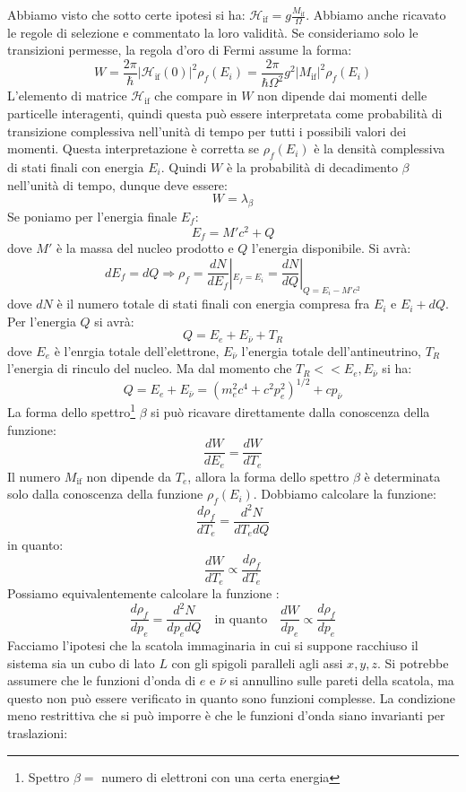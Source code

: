 Abbiamo visto che sotto certe ipotesi si ha: 
$\mathcal{H}_{\text{if}}=g\frac{M_{\text{if}}}{\Omega}$.
Abbiamo anche ricavato le regole di selezione e commentato la loro validità. Se
consideriamo solo le transizioni permesse, la regola d'oro di Fermi assume la
forma:
\[
W=\frac{2\pi}{\hbar}|\mathcal{H}_{\text{if}}(0)|^2\rho_f(E_i)=\frac{2\pi}{\hbar
\Omega^2}g^2|M_{\text{if}}|^2\rho_f(E_i)
\]
L'elemento di matrice $\mathcal{H}_{\text{if}}$ che compare in $W$ non dipende
dai momenti delle particelle interagenti, quindi questa può essere interpretata
come probabilità di transizione
complessiva nell'unità di tempo per tutti i possibili valori dei momenti. 
Questa
interpretazione è corretta se $\rho_f(E_i)$ è la densità complessiva di stati
finali con energia $E_i$.
Quindi $W$ è la probabilità di decadimento $\beta$ nell'unità di tempo, 
dunque deve essere:
\[
W=\lambda_{\beta}
\]
Se poniamo per l'energia finale $E_f$:
\[
E_f=M'c^2+Q
\]
dove $M'$ è la massa del nucleo prodotto e $Q$ l'energia disponibile. Si avrà:
\[
dE_f=dQ\Rightarrow\rho_f=\frac{dN}{dE_f}|_{E_f=E_i}=\frac{dN}{dQ}|_{Q=E_i-M'c^2}
\]
dove $dN$ è il numero totale di stati finali con energia compresa fra $E_i$ e
$E_i+dQ$. Per l'energia $Q$ si avrà:
\[
Q=E_e+E_{\bar{\nu}}+T_R
\]
dove $E_e$ è l'enrgia totale dell'elettrone, $E_{\bar{\nu}}$ l'energia totale
dell'antineutrino, $T_R$ l'energia di rinculo del nucleo.
Ma dal momento che $T_R<<E_e,E_{\bar{\nu}}$ si ha:
\[
Q=E_e+E_{\bar{\nu}}=(m_e^2c^4+c^2p_e^2)^{1/2}+cp_{\bar{\nu}}
\]
La forma dello spettro\footnote{Spettro $\beta=$ numero di elettroni con una
certa energia} $\beta$ si può ricavare direttamente dalla conoscenza della
funzione:
\[
\frac{dW}{dE_e}=\frac{dW}{dT_e}
\]
Il numero $M_{\text{if}}$ non dipende da $T_e$, allora la forma dello spettro
$\beta$ è determinata solo dalla conoscenza della funzione $\rho_f(E_i)$.
Dobbiamo calcolare la funzione:
\[
\frac{d\rho_f}{dT_e}=\frac{d^2N}{dT_edQ}
\]
in quanto:
\[
\frac{dW}{dT_e}\propto\frac{d\rho_f}{dT_e}
\]
Possiamo equivalentemente calcolare la funzione :
\[
\frac{d\rho_f}{dp_e}=\frac{d^2N}{dp_edQ}\quad\text{in 
quanto}\quad\frac{dW}{dp_e}\propto\frac{d\rho_f}{dp_e}
\]
Facciamo l'ipotesi che la scatola immaginaria in cui si suppone racchiuso il 
sistema sia un cubo di lato $L$ con gli spigoli paralleli agli assi $x,y,z$. Si 
potrebbe assumere che le
funzioni d'onda di $e$ e $\bar{\nu}$ si annullino sulle pareti della scatola, 
ma questo non può essere verificato in quanto sono funzioni complesse. La 
condizione meno restrittiva che si può
imporre è che le funzioni d'onda siano invarianti per traslazioni:
